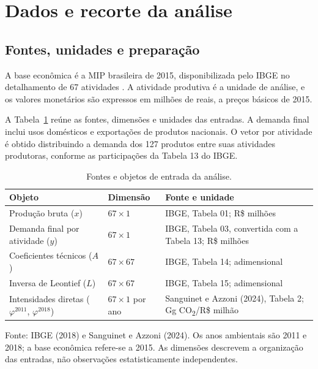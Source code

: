 \section{Dados e recorte da análise}
\label{sec:dados}

\subsection{Fontes, unidades e preparação}

A base econômica é a MIP brasileira de 2015, disponibilizada pelo IBGE no detalhamento de 67 atividades \parencite{ibge2015mip}. A atividade produtiva é a unidade de análise, e os valores monetários são expressos em milhões de reais, a preços básicos de 2015.

A Tabela~\ref{tab:fontes} reúne as fontes, dimensões e unidades das entradas. A demanda final inclui usos domésticos e exportações de produtos nacionais. O vetor por atividade é obtido distribuindo a demanda dos 127 produtos entre suas atividades produtoras, conforme as participações da Tabela 13 do IBGE.

\begin{table}[htbp]
\centering
\caption{Fontes e objetos de entrada da análise.}
\label{tab:fontes}
\small
\begin{tabular}{@{}>{\raggedright\arraybackslash}p{}>{\raggedright\arraybackslash}p{}>{\raggedright\arraybackslash}p{}@{}}
\toprule
Objeto & Dimensão & Fonte e unidade \\
\midrule
Produção bruta ($x$) & $67\times1$ & IBGE, Tabela 01; R\$ milhões \\
Demanda final por atividade ($y$) & $67\times1$ & IBGE, Tabela 03, convertida com a Tabela 13; R\$ milhões \\
Coeficientes técnicos ($A$) & $67\times67$ & IBGE, Tabela 14; adimensional \\
Inversa de Leontief ($L$) & $67\times67$ & IBGE, Tabela 15; adimensional \\
Intensidades diretas ($\varphi^{2011}$, $\varphi^{2018}$) & $67\times1$ por ano & Sanguinet e Azzoni (2024), Tabela 2; Gg CO\textsubscript{2}/R\$ milhão \\
\bottomrule
\end{tabular}
\par\smallskip
\begin{minipage}{\textwidth}\footnotesize
Fonte: IBGE (2018) e Sanguinet e Azzoni (2024). Os anos ambientais são 2011 e 2018; a base econômica refere-se a 2015. As dimensões descrevem a organização das entradas, não observações estatisticamente independentes.
\end{minipage}
\end{table}

